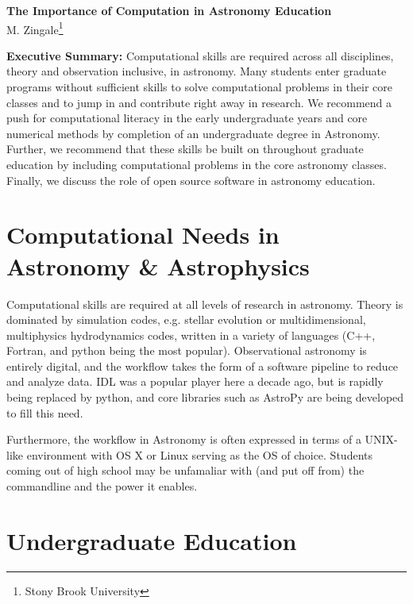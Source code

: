 \documentclass[11pt]{article}
\begin{document}
\thispagestyle{plain}

\begin{center}
{\Large \sffamily \bfseries The Importance of Computation in Astronomy Education} \\
{M. Zingale\footnote{Stony Brook University}}
\end{center}

\begin{tcolorbox}
{\sffamily \bfseries Executive Summary:} Computational skills are required
across all disciplines, theory and observation inclusive, in astronomy.
Many students enter graduate programs without sufficient skills
to solve computational problems in their core classes and to jump in and
contribute right away in research.  We recommend a push for computational
literacy in the early undergraduate years and core numerical methods by
completion of an undergraduate degree in Astronomy.  Further, we recommend
that these skills be built on throughout graduate education by including
computational problems in the core astronomy classes.  Finally, we discuss
the role of open source software in astronomy education.
\end{tcolorbox}

\section{Computational Needs in Astronomy \& Astrophysics}

Computational skills are required at all levels of research in
astronomy.  Theory is dominated by simulation codes, e.g. stellar
evolution or multidimensional, multiphysics hydrodynamics codes,
written in a variety of languages (C++, Fortran, and python being the
most popular).  Observational astronomy is entirely digital, and the
workflow takes the form of a software pipeline to reduce and analyze
data.  IDL was a popular player here a decade ago, but is rapidly
being replaced by python, and core libraries such as AstroPy are being
developed to fill this need.

Furthermore, the workflow in Astronomy is often expressed in terms of
a UNIX-like environment with OS X or Linux serving as the OS of
choice.  Students coming out of high school may be unfamaliar with
(and put off from) the commandline and the power it enables.

\section{Undergraduate Education}
\end{document}
